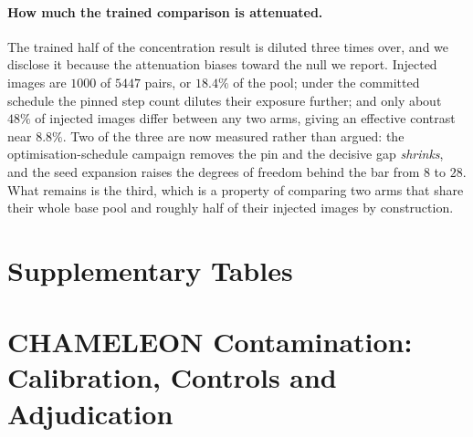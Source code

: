 \documentclass{article}
\begin{document}
\paragraph{How much the trained comparison is attenuated.} The trained half of the concentration
result is diluted three times over, and we disclose it because the attenuation biases toward the
null we report. Injected images are $1000$ of $5447$ pairs, or $18.4\%$ of the pool; under the
committed schedule the pinned step count dilutes their exposure further; and only about $48\%$ of
injected images differ between any two arms, giving an effective contrast near $8.8\%$. Two of the
three are now measured rather than argued: the optimisation-schedule campaign removes the pin and
the decisive gap \emph{shrinks}, and the seed expansion raises the degrees of freedom behind the
bar from $8$ to $28$. What remains is the third, which is a property of comparing two arms that
share their whole base pool and roughly half of their injected images by construction.

\section{Supplementary Tables}
\label{app:tables}





\clearpage


\section{CHAMELEON Contamination: Calibration, Controls and Adjudication}
\label{app:chamext}
\end{document}
